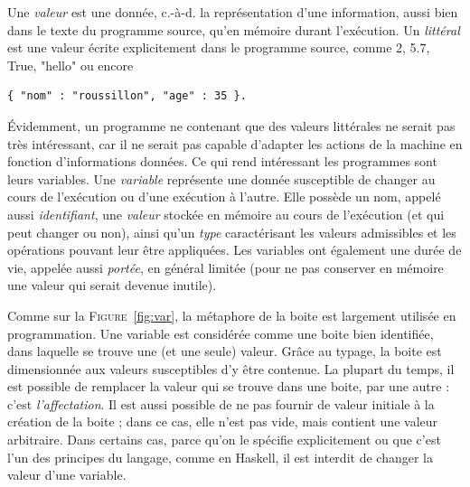 \documentclass[a4paper,francais]{insalyon}
\newcommand{\cad}{c.-à-d.}
\begin{document}
Une \emph{valeur} est une donnée, {\cad} la représentation d'une information, aussi bien dans le texte du programme source, qu'en mémoire durant l'exécution. 
Un \emph{littéral} est une valeur écrite explicitement dans le programme source, comme 2, 5.7, True, "hello" ou encore
\begin{verbatim}
{ "nom" : "roussillon", "age" : 35 }.
\end{verbatim}
\'Evidemment, un programme ne contenant que des valeurs littérales ne serait pas très intéressant, car il ne serait pas capable d'adapter les actions de la machine en fonction d'informations données. Ce qui rend intéressant les programmes sont leurs variables. 
Une \emph{variable} représente une donnée susceptible de changer au cours de l'exécution ou d'une exécution à l'autre. Elle possède un nom, appelé aussi \emph{identifiant}, une \emph{valeur} stockée en mémoire au cours de l'exécution (et qui peut changer ou non), ainsi qu'un \emph{type} caractérisant les valeurs admissibles et les opérations pouvant leur être appliquées. Les variables ont également une durée de vie, appelée aussi \emph{portée}, en général limitée (pour ne pas conserver en mémoire une valeur qui serait devenue inutile).  

Comme sur la \textsc{Figure}~\ref{fig:var}, la métaphore de la boite est largement utilisée en programmation. Une variable est considérée comme une boite bien identifiée, dans laquelle se trouve une (et une seule) valeur. Grâce au typage, la boite est dimensionnée aux valeurs susceptibles d'y être contenue. La plupart du temps, il est possible de remplacer la valeur qui se trouve dans une boite, par une autre : c'est \emph{l'affectation}. Il est aussi possible de ne pas fournir de valeur initiale à la création de la boite ; dans ce cas, elle n'est pas vide, mais contient une valeur arbitraire. Dans certains cas, parce qu'on le spécifie explicitement ou que c'est l'un des principes du langage, comme en Haskell, il est interdit de changer la valeur d'une variable.
\end{document}
